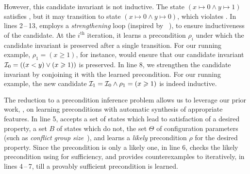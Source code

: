 \documentclass[conference]{IEEEtran}
\begin{document}
However, this candidate invariant is not inductive.
The state $(x \mapsto 0 \wedge y \mapsto 1)$ satisfies \Inv,
but it may transition to state $(x \mapsto 0 \wedge y \mapsto 0)$, which violates \Inv.
In lines 2\,--\,13, \Infer employs a \emph{strengthening} loop (inspired by ~\cite{Dillig2013InductiveIG}),
to ensure inductiveness of the candidate.
At the $i^\text{th}$ iteration, it learns a precondition $\rho_i$
under which the candidate invariant is preserved after a single transition.
For our running example, $\rho_1 = (x \geqslant 1)$, for instance,
would ensure that our candidate invariant $\mathcal{I}_0 = ((x < y) \vee (x \geqslant 1))$ is preserved.
In line 8, we strengthen the candidate invariant by conjoining it with the learned precondition.
For our running example, the new candidate $\mathcal{I}_1 = \mathcal{I}_0 \wedge \rho_1 = (x \geqslant 1)$ is indeed inductive.

The reduction to a precondition inference problem allows us to leverage our prior work, \PIE,
on learning preconditions with automatic synthesis of appropriate features.
In line 5, \PIE accepts a set \States of states which lead to satisfaction of a desired property,
a set $B$ of states which do not, the set $\Theta$ of configuration parameters
(such as \emph{conflict group size}~\cite{Padhi2016DatadrivenPI}),
and learns a \emph{likely} precondition $\rho$ for the desired property.
Since the precondition is only a likely one, in line 6, \Infer checks the likely precondition using \Checker for sufficiency,
and provides counterexamples to \PIE iteratively, in lines 4\,--\,7, till a provably sufficient precondition is learned.
\end{document}
